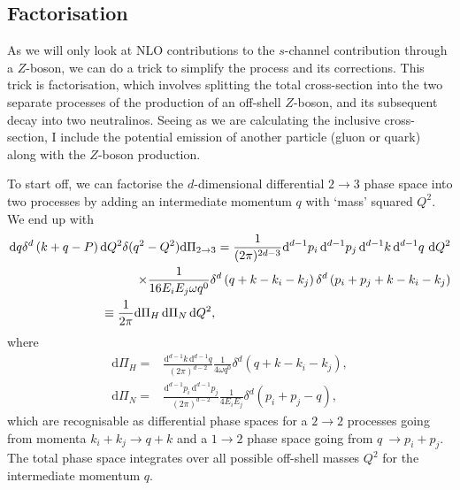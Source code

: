 \documentclass[../main.tex]{subfiles}
\begin{document}
\subsection{Factorisation}
As we will only look at NLO contributions to the \(s\)-channel contribution through a \(Z\)-boson, we can do a trick to simplify the process and its corrections.
This trick is factorisation, which involves splitting the total cross-section into the two separate processes of the production of an off-shell \(Z\)-boson, and its subsequent decay into two neutralinos.
Seeing as we are calculating the inclusive cross-section, I include the potential emission of another particle (gluon or quark) along with the \(Z\)-boson production.

To start off, we can factorise the \(d\)-dimensional differential \(2\to 3\) phase space into two processes by adding an intermediate momentum \(q\) with `mass' squared \(Q^2\).
We end up with
\begin{align}
  \nonumber
  \mathrm{d}q \delta^d\pclosed{k+q-P} \mathrm{d}Q^2 \delta(q^2-Q^2) \mathrm{d}\Pi_{2\to 3} = \frac{1}{(2\pi)^{2d-3}}\mathrm{d}^{d-1}p_i\,\mathrm{d}^{d-1}p_j\,\mathrm{d}^{d-1}k\,\mathrm{d}^{d-1}q\,\,\mathrm{d}Q^2 \\
  \nonumber
  \times \frac{1}{16E_iE_j\omega q^0} \delta^d\pclosed{q+k - k_i-k_j}\delta^d\pclosed{p_i+p_j+k - k_i-k_j}                                                                                                          \\
  \equiv                                                                                       \frac{1}{2\pi} \mathrm{d}\Pi_H\, \mathrm{d}\Pi_N\, \mathrm{d}Q^2,\hspace{6.7cm}
\end{align}
where
\begin{subequations}
  \begin{align}
    \mathrm{d}\Pi_H = & \frac{\mathrm{d}^{d-1}k\, \mathrm{d}^{d-1}q}{(2\pi)^{d-2}} \frac{1}{4\omega q^0} \delta^d(q+k-k_i-k_j), \\
    \mathrm{d}\Pi_N = & \frac{\mathrm{d}^{d-1}p_i\, \mathrm{d}^{d-1}p_j}{(2\pi)^{d-2}} \frac{1}{4E_iE_j} \delta^d(p_i+p_j-q),
  \end{align}
\end{subequations}
which are recognisable as differential phase spaces for a \(2\to 2\) processes going from momenta \(k_i+k_j \to q+k\) and a \(1\to 2\) phase space going from \(q\ \to p_i+p_j\).
The total phase space integrates over all possible off-shell masses \(Q^2\) for the intermediate momentum \(q\).
\end{document}
